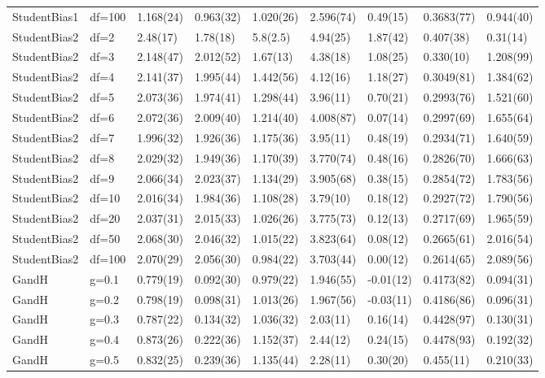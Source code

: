 \begin{table}[ht]
\begin{tabular}{lllllllll}
  StudentBias1 & df=100 & 1.168(24) & 0.963(32) & 1.020(26) & 2.596(74) & 0.49(15) & 0.3683(77) & 0.944(40) \\ 
  StudentBias2 & df=2 & 2.48(17) & 1.78(18) & 5.8(2.5) & 4.94(25) & 1.87(42) & 0.407(38) & 0.31(14) \\ 
  StudentBias2 & df=3 & 2.148(47) & 2.012(52) & 1.67(13) & 4.38(18) & 1.08(25) & 0.330(10) & 1.208(99) \\ 
  StudentBias2 & df=4 & 2.141(37) & 1.995(44) & 1.442(56) & 4.12(16) & 1.18(27) & 0.3049(81) & 1.384(62) \\ 
  StudentBias2 & df=5 & 2.073(36) & 1.974(41) & 1.298(44) & 3.96(11) & 0.70(21) & 0.2993(76) & 1.521(60) \\ 
  StudentBias2 & df=6 & 2.072(36) & 2.009(40) & 1.214(40) & 4.008(87) & 0.07(14) & 0.2997(69) & 1.655(64) \\ 
  StudentBias2 & df=7 & 1.996(32) & 1.926(36) & 1.175(36) & 3.95(11) & 0.48(19) & 0.2934(71) & 1.640(59) \\ 
  StudentBias2 & df=8 & 2.029(32) & 1.949(36) & 1.170(39) & 3.770(74) & 0.48(16) & 0.2826(70) & 1.666(63) \\ 
  StudentBias2 & df=9 & 2.066(34) & 2.023(37) & 1.134(29) & 3.905(68) & 0.38(15) & 0.2854(72) & 1.783(56) \\ 
  StudentBias2 & df=10 & 2.016(34) & 1.984(36) & 1.108(28) & 3.79(10) & 0.18(12) & 0.2927(72) & 1.790(56) \\ 
  StudentBias2 & df=20 & 2.037(31) & 2.015(33) & 1.026(26) & 3.775(73) & 0.12(13) & 0.2717(69) & 1.965(59) \\ 
  StudentBias2 & df=50 & 2.068(30) & 2.046(32) & 1.015(22) & 3.823(64) & 0.08(12) & 0.2665(61) & 2.016(54) \\ 
  StudentBias2 & df=100 & 2.070(29) & 2.056(30) & 0.984(22) & 3.703(44) & 0.00(12) & 0.2614(65) & 2.089(56) \\ 
  GandH & g=0.1 & 0.779(19) & 0.092(30) & 0.979(22) & 1.946(55) & -0.01(12) & 0.4173(82) & 0.094(31) \\ 
  GandH & g=0.2 & 0.798(19) & 0.098(31) & 1.013(26) & 1.967(56) & -0.03(11) & 0.4186(86) & 0.096(31) \\ 
  GandH & g=0.3 & 0.787(22) & 0.134(32) & 1.036(32) & 2.03(11) & 0.16(14) & 0.4428(97) & 0.130(31) \\ 
  GandH & g=0.4 & 0.873(26) & 0.222(36) & 1.152(37) & 2.44(12) & 0.24(15) & 0.4478(93) & 0.192(32) \\ 
  GandH & g=0.5 & 0.832(25) & 0.239(36) & 1.135(44) & 2.28(11) & 0.30(20) & 0.455(11) & 0.210(33) \\ 

\end{tabular}
\end{table}
